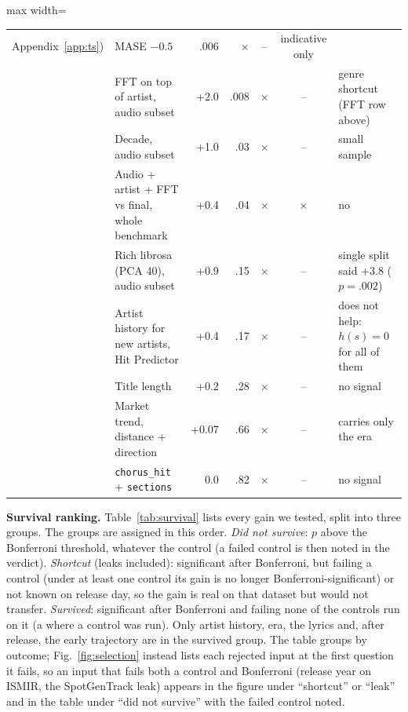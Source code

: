 \documentclass[conference]{IEEEtran}
\begin{document}
\begin{table}[t]
\begin{adjustbox}{max width=\textwidth}
\begin{tabular}{@{}l>{\raggedright\arraybackslash}p{5.6cm}rrcc>{\raggedright\arraybackslash}p{6.2cm}@{}}
Appendix~\ref{app:ts}) & MASE $-0.5$ & .006 & $\times$ & -- & indicative only \\
& FFT on top of artist, audio subset & +2.0 & .008 & $\times$ & -- & genre shortcut (FFT row above) \\
& Decade, audio subset & +1.0 & .03 & $\times$ & -- & small sample \\
& Audio + artist + FFT vs final, whole benchmark & +0.4 & .04 & $\times$ & $\times$ & no \\
& Rich librosa (PCA 40), audio subset & +0.9 & .15 & $\times$ & -- & single split said +3.8 ($p=.002$) \\
& Artist history for new artists, Hit Predictor & +0.4 & .17 & $\times$ & -- & does not help: $h(s)=0$ for all of them \\
& Title length & +0.2 & .28 & $\times$ & -- & no signal \\
& Market trend, distance + direction & +0.07 & .66 & $\times$ & -- & carries only the era \\
& \texttt{chorus\_hit} + \texttt{sections} & 0.0 & .82 & $\times$ & -- & no signal \\
\bottomrule
\end{tabular}
\end{adjustbox}
\end{table}

\textbf{Survival ranking.} Table~\ref{tab:survival} lists every gain we tested, split into three groups.
The groups are assigned in this order. \emph{Did not survive}: $p$ above the Bonferroni threshold, whatever the
control (a failed control is then noted in the verdict). \emph{Shortcut} (leaks included): significant after Bonferroni, but
failing a control (under at least one control its gain is no longer Bonferroni-significant) or not known on
release day, so the gain is real on that dataset but would not transfer. \emph{Survived}: significant after
Bonferroni and failing none of the controls run on it (a \checkmark{} where a control was run). Only artist history, era, the lyrics and, after release, the early
trajectory are in the survived group. The table groups by outcome; Fig.~\ref{fig:selection} instead lists each
rejected input at the first question it fails, so an input that fails both a control and Bonferroni (release year
on ISMIR, the SpotGenTrack leak) appears in the figure under ``shortcut'' or ``leak'' and in the table under ``did
not survive'' with the failed control noted.
\end{document}
